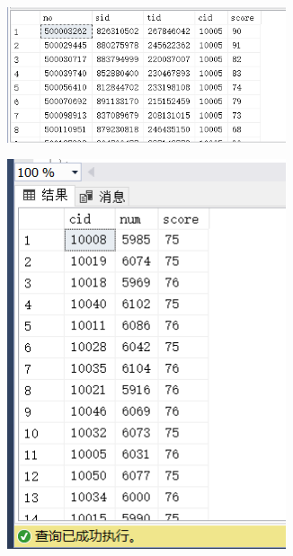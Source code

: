 \documentclass[a4paper,twoside]{article}
\begin{document}
\begin{spacing}{1.2}
\begin{enumerate}
\begin{figure}[htb]
  \centering
  \begin{subfigure}{0.4\textwidth}
    \centering
    \includegraphics[width=0.9\textwidth]{1.png}
  \end{subfigure}
  \begin{subfigure}{0.2\textwidth}
    \centering
    \includegraphics[width=0.9\textwidth]{2.png}
  \end{subfigure}
\end{figure}


\end{enumerate}
\end{spacing}
\end{document}

